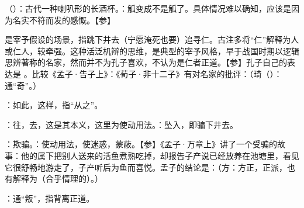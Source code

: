 {
\item {}（）：古代一种喇叭形的长酒杯。：觚变成不是觚了。具体情况难以确知，应该是因为名实不符而发的感慨。【参】
}
{}  %


{
\item {}是宰予假设的场景，指跳下井去（宁愿淹死也要）追寻仁。古注多将“仁”解释为人或仁人，较牵强。这种活泛机辩的思维，是典型的宰予风格，早于战国时期以逻辑思辨著称的名家，然而并不为孔子喜欢，不认为是仁者正道。【参】孔子自己的表达是  。比较《孟子·告子上》：《荀子·非十二子》有对名家的批评：（琦（）：通“奇”。）
\item {}：如此，这样，指“从之”。
\item {}：往，去，这是其本义，这里为使动用法。：坠入，即骗下井去。
\item {}：欺骗。：使动用法，使迷惑，蒙蔽。【参】《孟子·万章上》讲了一个受骗的故事：他的属下把别人送来的活鱼煮熟吃掉，却报告子产说已经放养在池塘里，看见它很舒畅地游走了，子产听后为鱼而喜悦。孟子的结论是：（方：方正，正派，也有解释为（合乎情理的）。）
}
{}


{
\item {}：通“叛”，指背离正道。
}
{}


